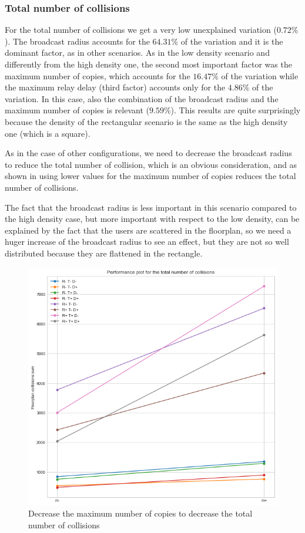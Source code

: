 \subsubsection{Total number of collisions}\label{subsubsec:rect2krcollisions}

For the total number of collisions we get a very low unexplained variation
(\(0.72\%\)). The broadcast radius accounts for the \(64.31\%\) of the variation
and it is the dominant factor, as in other scenarios. As in the low density
scenario and differently from the high density one, the second most important
factor was the maximum number of copies, which accounts for the \(16.47\%\) of
the variation while the maximum relay delay (third factor) accounts only for the
\(4.86\%\) of the variation. In this case, also the combination of the broadcast
radius and the maximum number of copies is relevant (\(9.59\%\)). This results
are quite surprisingly because the density of the rectangular scenario is the same
as the high density one (which is a square).

As in the case of other configurations, we need to decrease the broadcast radius
to reduce the total number of collision, which is an obvious consideration, and
as shown in  using lower values for the maximum
number of copies reduces the total number of collisions.

The fact that the broadcast radius is less important in this scenario compared
to the high density case, but more important with respect to the low density,
can be explained by the fact that the users are scattered in the floorplan, so
we need a huger increase of the broadcast radius to see an effect, but they are
not so well distributed because they are flattened in the rectangle.

\begin{figure}[htb]
	\centering
	\includegraphics[width=\textwidth]{img/rect/collisions_m_perfplot.png}
	\caption{Decrease the maximum number of copies to decrease the total
	number of collisions}\label{fig:rectperfcollisionsm}
\end{figure}
